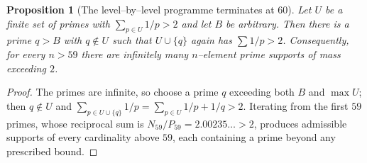 \documentclass[11pt]{article}
\newtheorem{proposition}[theorem]{Proposition}
\theoremstyle{definition}
\begin{document}
\begin{proposition}[The level--by--level programme terminates at $60$]\label{prop:levelbarrier}
Let $U$ be a finite set of primes with $\sum_{p\in U}1/p>2$ and let $B$ be arbitrary. Then there is a
prime $q>B$ with $q\notin U$ such that $U\cup\{q\}$ again has $\sum 1/p>2$. Consequently, for every
$n>59$ there are infinitely many $n$--element prime supports of mass exceeding $2$.
\end{proposition}

\begin{proof}
The primes are infinite, so choose a prime $q$ exceeding both $B$ and $\max U$; then $q\notin U$ and
$\sum_{p\in U\cup\{q\}}1/p=\sum_{p\in U}1/p+1/q>2$. Iterating from the first $59$ primes, whose
reciprocal sum is $N_{59}/P_{59}=2.00235\ldots>2$, produces admissible supports of every cardinality
above $59$, each containing a prime beyond any prescribed bound.
\end{proof}
\end{document}
